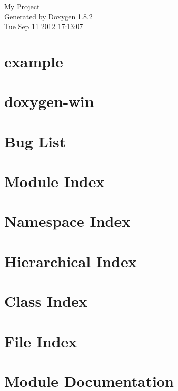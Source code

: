 \documentclass{book}
\begin{document}
\hypersetup{pageanchor=false,citecolor=blue}
\begin{titlepage}
\vspace*{7cm}
\begin{center}
{\Large My Project }\\
\vspace*{1cm}
{\large Generated by Doxygen 1.8.2}\\
\vspace*{0.5cm}
{\small Tue Sep 11 2012 17:13:07}\\
\end{center}
\end{titlepage}
\clearemptydoublepage
{}
\tableofcontents
\clearemptydoublepage
{}
\hypersetup{pageanchor=true,citecolor=blue}
\chapter{example}
\label{example}
\hypertarget{example}{}

\chapter{doxygen-\/win}
\label{md_README}
\hypertarget{md_README}{}

\chapter{Bug List}
\label{bug}
\hypertarget{bug}{}

\chapter{Module Index}

\chapter{Namespace Index}

\chapter{Hierarchical Index}

\chapter{Class Index}

\chapter{File Index}

\chapter{Module Documentation}





\end{document}
